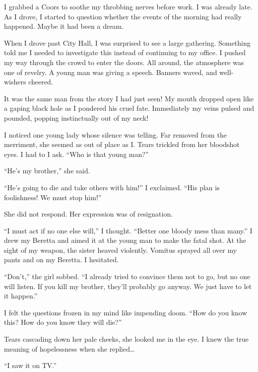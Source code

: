 I grabbed a Coors to soothe my throbbing nerves before work. I was
already late. As I drove, I started to question whether the events
of the morning had really happened. Maybe it had been a
dream.



When I drove past City Hall, I was surprised to see a large
gathering. Something told me I needed to investigate this instead
of continuing to my office. I pushed my way through the crowd to
enter the doors. All around, the atmosphere was one of revelry. A
young man was giving a speech. Banners waved, and well-wishers
cheered.



It was the same man from the story I had just seen! My mouth
dropped open like a gaping black hole as I pondered his cruel fate.
Immediately my veins pulsed and pounded, popping instinctually out
of my neck!



I noticed one young lady whose silence was telling. Far removed
from the merriment, she seemed as out of place as I. Tears trickled
from her bloodshot eyes. I had to I ask. ``Who is that young
man?''



``He's my brother,'' she said.



``He's going to die and take others with him!'' I
exclaimed. ``His plan is foolishness! We must stop
him!''



She did not respond. Her expression was of resignation.



``I must act if no one else will,'' I thought.
``Better one bloody mess than many.'' I drew my Beretta
and aimed it at the young man to make the fatal shot. At the sight
of my weapon, the sister heaved violently. Vomitus sprayed all over
my pants and on my Beretta. I hesitated.



``Don't,'' the girl sobbed. ``I already tried
to convince them not to go, but no one will listen. If you kill my
brother, they'll probably go anyway. We just have to let it
happen.''



I felt the questions frozen in my mind like impending doom.
``How do you know this? How do you know they will
die?''



Tears cascading down her pale cheeks, she looked me in the eye. I
knew the true meaning of hopelessness when she
replied{\ldots}



``I saw it on TV.'' 
 







